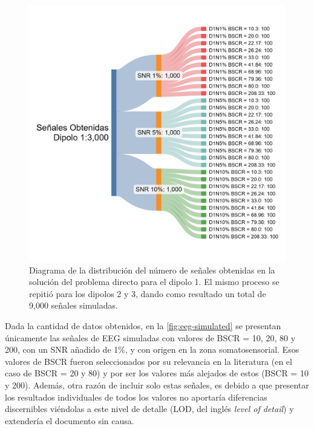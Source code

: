 \begin{figure}[tb]
    \centering
    \includegraphics[width=\textwidth]{gfx/sankey-direct.png}
    \caption{Diagrama de la distribución del número de señales obtenidas en la solución del problema directo para el dipolo 1. El mismo proceso se repitió para los dipolos 2 y 3, dando como resultado un total de 9,000 señales simuladas.}
    \label{fig:sankey-direct}
\end{figure}

Dada la cantidad de datos obtenidos, en la \cref{fig:eeg-simulated} se presentan únicamente las señales de EEG simuladas con valores de BSCR = 10, 20, 80 y 200, con un SNR añadido de 1\%, y con origen en la zona somatosensorial. 
Esos valores de BSCR fueron seleccionados por su relevancia en la literatura (en el caso de BSCR = 20 y 80) y por ser los valores más alejados de estos (BSCR = 10 y 200).
Además, otra razón de incluir solo estas señales, es debido a que presentar los resultados individuales de todos los valores no aportaría diferencias discernibles viéndolas a este nivel de detalle (LOD, del inglés \emph{level of detail}) y extendería el documento sin causa.


